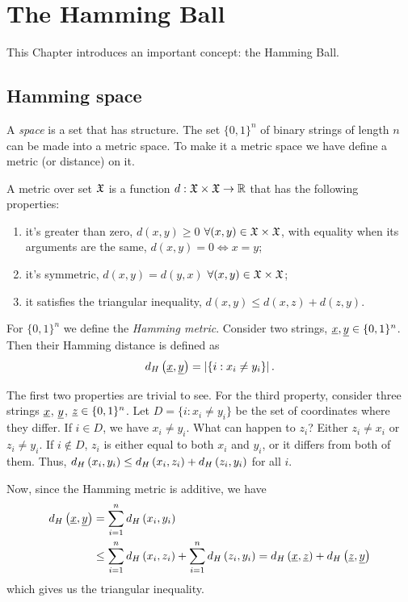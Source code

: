 \chapter{The Hamming Ball}

This Chapter introduces an important concept: the Hamming Ball.

\section{Hamming space}

A \emph{space} is a set that has structure.
The set $\{0,1\}^{n}$ of binary strings of length $n$ can be made into a metric space.
To make it a metric space we have define a metric (or distance) on it.

A metric over set $\mathfrak{X}$ is a function $d: \mathfrak{X} \times \mathfrak{X} \rightarrow \mathbb{R}$ that has the following properties:
\begin{enumerate}
	\item it's greater than zero, \ie $d(x, y) \geq 0$ $\forall (x, y) \in \mathfrak{X} \times \mathfrak{X}$, with equality when its arguments are the same, \ie $d(x, y) = 0 \iff x = y$;
	\item it's symmetric, \ie $d(x, y) = d(y, x)$ $\forall (x, y) \in \mathfrak{X} \times \mathfrak{X}$;
	\item it satisfies the triangular inequality, \ie $d(x, y) \leq d(x, z) + d(z, y)$.
\end{enumerate}

For $\{0,1\}^{n}$ we define the \emph{Hamming metric}.
Consider two strings, $\underline{x}, \underline{y}  \in \{0, 1\}^n$.
Then their Hamming distance is defined as
\begin{equation}
	d_H \left({\underline{x}, \underline{y}}\right) = \left|{\{i : x_i \not= y_i\}}\right|.
\end{equation}

The first two properties are trivial to see.
For the third property, consider three strings $\underline{x}$, $\underline{y}$, $\underline{z} \in \{0,1\}^n$.
Let $D = \{i : x_i \not= y_i\}$ be the set of coordinates where they differ.
If $i \in D$, we have $x_{i} \neq y_{i}$.
What can happen to $z_{i}$?
Either $z_{i} \neq x_{i}$ or $z_{i} \neq y_{i}$.
If $i \not\in D$, $z_{i}$ is either equal to both $x_{i}$ and $y_{i}$, or it differs from both of them.
Thus, $d_H \left({x_{i},y_{i}}\right) \le d_H \left({x_{i},z_{i}}\right) + d_H \left({z_{i},y_{i}}\right)$ for all $i$.

Now, since the Hamming metric is additive, we have
\begin{align*}
	d_H \left({\underline{x},\underline{y}}\right) & =
	\sum_{i = 1}^n d_H \left({x_i,y_i}\right) \\
	& \le
	\sum_{i = 1}^n d_H \left({x_i,z_i}\right) +
	\sum_{i = 1}^n d_H \left({z_i,y_i}\right)
	=
	d_H \left({\underline{x},\underline{z}}\right) +
	d_H \left({\underline{z},\underline{y}}\right)
\end{align*}
which gives us the triangular inequality.

